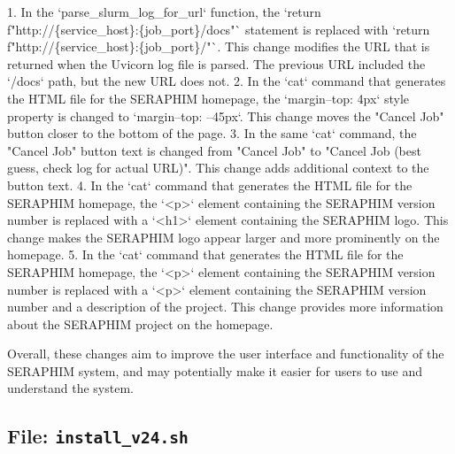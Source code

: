 \documentclass{article}
\begin{document}
{1. In the `parse\_slurm\_log\_for\_url` function, the `return f"http://\{service\_host\}:\{job\_port\}/docs"` statement is replaced with `return f"http://\{service\_host\}:\{job\_port\}/"`. This change modifies the URL that is returned when the Uvicorn log file is parsed. The previous URL included the `/docs` path, but the new URL does not.
2. In the `cat` command that generates the HTML file for the SERAPHIM homepage, the `margin--top: 4px` style property is changed to `margin--top: --45px`. This change moves the "Cancel Job" button closer to the bottom of the page.
3. In the same `cat` command, the "Cancel Job" button text is changed from "Cancel Job" to "Cancel Job (best guess, check log for actual URL)". This change adds additional context to the button text.
4. In the `cat` command that generates the HTML file for the SERAPHIM homepage, the `\textless{}p\textgreater{}` element containing the SERAPHIM version number is replaced with a `\textless{}h1\textgreater{}` element containing the SERAPHIM logo. This change makes the SERAPHIM logo appear larger and more prominently on the homepage.
5. In the `cat` command that generates the HTML file for the SERAPHIM homepage, the `\textless{}p\textgreater{}` element containing the SERAPHIM version number is replaced with a `\textless{}p\textgreater{}` element containing the SERAPHIM version number and a description of the project. This change provides more information about the SERAPHIM project on the homepage.

Overall, these changes aim to improve the user interface and functionality of the SERAPHIM system, and may potentially make it easier for users to use and understand the system.\n}\n\n\subsection{File: \texttt{install\_v24.sh}}
\end{document}
